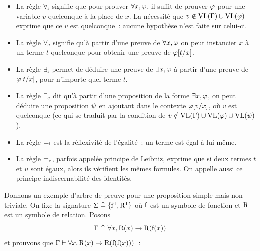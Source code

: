 \begin{itemize}
  alors on peut en déduire $\varFP$. C'est la règle du .
\item La règle $\mathord{\forall}_{\mathrm{i}}$ signifie que pour prouver $\forall x, \varphi$, il
  suffit de prouver $\varphi$ pour une variable $v$ quelconque à la place de $x$.
  La nécessité que $v\notin\operatorname{VL}(\Gamma)\cup\operatorname{VL}(\varphi)$ exprime que ce $v$ est
  quelconque~: aucune hypothèse n'est faite sur celui-ci.
\item La règle $\mathord{\forall}_{\mathrm{e}}$ signifie qu'à partir d'une preuve de
  $\forall x, \varphi$ on peut instancier $x$ à un terme $t$ quelconque pour
  obtenir une preuve de $\varphi[t/x]$.
\item La règle $\mathord{\exists}_{\mathrm{i}}$ permet de déduire une preuve de $\exists x,\varphi$
  à partir d'une preuve de $\varphi[t/x]$, pour n'importe quel terme $t$.
\item La règle $\mathord{\exists}_{\mathrm{e}}$ dit qu'à partir d'une proposition de la forme
  $\exists x, \varphi$, on peut déduire une proposition $\varFP$ en ajoutant
  dans le contexte $\varphi[v/x]$, où $v$ est quelconque
  (ce qui se traduit par la condition
  de $v\notin\operatorname{VL}(\Gamma)\cup\operatorname{VL}(\varphi)\cup\operatorname{VL}(\psi)$).
\item La règle $\mathord{=}_{\mathrm{i}}$ est la réflexivité de l'égalité~: un terme est
  égal à lui-même.
\item La règle $\mathord{=}_{\mathrm{e}}$, parfois appelée principe de Leibniz, exprime que
  si deux termes $t$ et $u$ sont égaux, alors ils vérifient les mêmes formules.
  On appelle aussi ce principe \og indiscernabilité des identités\fg{}.
\end{itemize}

\begin{example}
  Donnons un exemple d'arbre de preuve pour une proposition simple mais non
  triviale. On fixe la signature $\Sigma \triangleq \{\mathrm{f}^1, \mathrm{R}^1\}$ où
  $\mathrm{f}$ est un symbole de fonction et $\mathrm{R}$ est un symbole de relation.
  Posons
  \[\Gamma \triangleq \forall x, \mathrm{R}(x) \to \mathrm{R}(\mathrm{f}(x))\]
  et prouvons que
  $\Gamma\vdash \forall x, \mathrm{R}(x) \to \mathrm{R}(\mathrm{f}(\mathrm{f}(x)))$~:
  \begin{center}
  \end{center}
\end{example}

